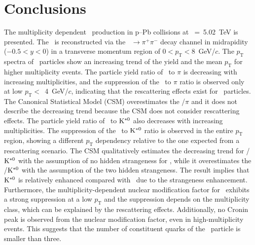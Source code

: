 
\section{Conclusions}
\label{sec:summary}

The multiplicity dependent \fzero~production in p--Pb collisions at \snn~=~5.02~TeV is presented. The \fzero~is reconstructed via the \fzero~$\rightarrow\pi^{+}\pi^{-}$ decay channel in midrapidity ($-0.5<y<0$) in a transverse momentum region of $0<p_{\mathrm{T}}<8$~GeV/$c$. The $p_{\mathrm{T}}$ spectra of \fzero~particles show an increasing trend of the yield and the mean $p_{\mathrm{T}}$ for higher multiplicity events. The particle yield ratio of \fzero~to $\pi$ is decreasing with increasing multiplicities, and the suppression of the \fzero~to $\pi$ ratio is observed only at low $p_{\mathrm{T}}<$~4~GeV/$c$, indicating that the rescattering effects exist for \fzero~particles. The Canonical Statistical Model (CSM) overestimates the \fzero/$\pi$ and it does not describe the decreasing trend because the CSM does not consider rescattering effects. The particle yield ratio of \fzero~to $\rm{}K^{*0}$ also decreases with increasing multiplicities. The suppression of the \fzero~to $\rm{}K^{*0}$ ratio is observed in the entire $p_{\mathrm{T}}$ region, showing a different $p_{\mathrm{T}}$ dependency relative to the one expected from a rescattering scenario. The CSM qualitatively estimates the decreasing trend for \fzero/$\rm{}K^{*0}$ with the assumption of no hidden strangeness for \fzero, while it overestimates the \fzero/$\rm{}K^{*0}$ with the assumption of the two hidden strangeness. The result implies that $\rm{}K^{*0}$ is relatively enhanced compared with \fzero~due to the strangeness enhancement. Furthermore, the multiplicity-dependent nuclear modification factor for \fzero~exhibits a strong suppression at a low $p_{\mathrm{T}}$ and the suppression depends on the multiplicity class, which can be explained by the rescattering effects. Additionally, no Cronin peak is observed from the nuclear modification factor, even in high-multiplicity events. This suggests that the number of constituent quarks of the \fzero~particle is smaller than three.